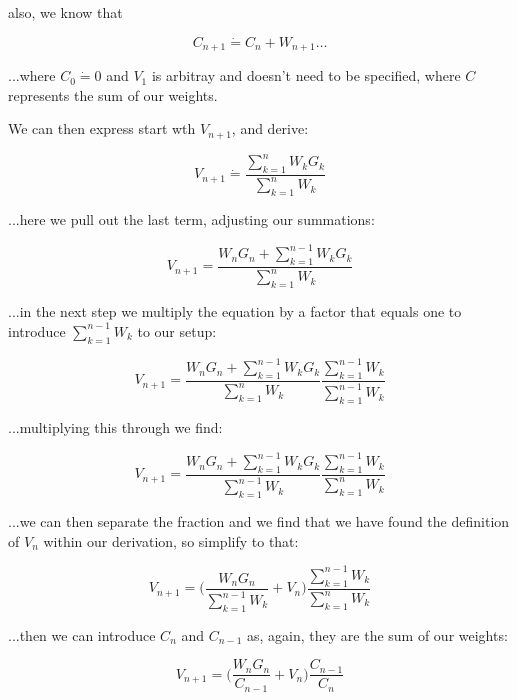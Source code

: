 \documentclass{article}
\begin{document}
also, we know that

\begin{equation}
    C_{n+1} \dot{=} C_n + W_{n+1}\dots
\end{equation}

...where $C_0 \dot{=} 0$ and $V_1$ is arbitray and doesn't need to be specified, where $C$ represents the sum of our weights.

We can then express start wth $V_{n+1}$, and derive:

\begin{equation}
    V_{n+1} \dot{=} \frac{\sum_{k=1}^{n}W_k G_k}{\sum_{k=1}^{n} W_k}
\end{equation}

...here we pull out the last term, adjusting our summations:

\begin{equation}
    V_{n+1} = \frac{W_n G_n + \sum_{k=1}^{n-1}W_k G_k}{\sum_{k=1}^{n} W_k}
\end{equation}

...in the next step we multiply the equation by a factor that equals one to introduce $\sum_{k=1}^{n-1} W_k$ to our setup:

\begin{equation}
    V_{n+1} = \frac{W_n G_n + \sum_{k=1}^{n-1}W_k G_k}{\sum_{k=1}^{n} W_k} \frac{\sum_{k=1}^{n-1} W_k}{\sum_{k=1}^{n-1} W_k}
\end{equation}

...multiplying this through we find:

\begin{equation}
    V_{n+1} = \frac{W_n G_n + \sum_{k=1}^{n-1}W_k G_k}{\sum_{k=1}^{n-1} W_k} \frac{\sum_{k=1}^{n-1} W_k}{\sum_{k=1}^{n} W_k}
\end{equation}

...we can then separate the fraction and we find that we have found the definition of $V_n$ within our derivation, so simplify to that:

\begin{equation}
    V_{n+1} = \bigg(\frac{W_n G_n}{\sum_{k=1}^{n-1} W_k} + V_n \bigg) \frac{\sum_{k=1}^{n-1} W_k}{\sum_{k=1}^{n} W_k}
\end{equation}

...then we can introduce $C_n$ and $C_{n-1}$ as, again, they are the sum of our weights:

\begin{equation}
    V_{n+1} = \bigg(\frac{W_n G_n}{C_{n-1}} + V_n \bigg) \frac{C_{n-1}}{C_n}
\end{equation}
\end{document}
